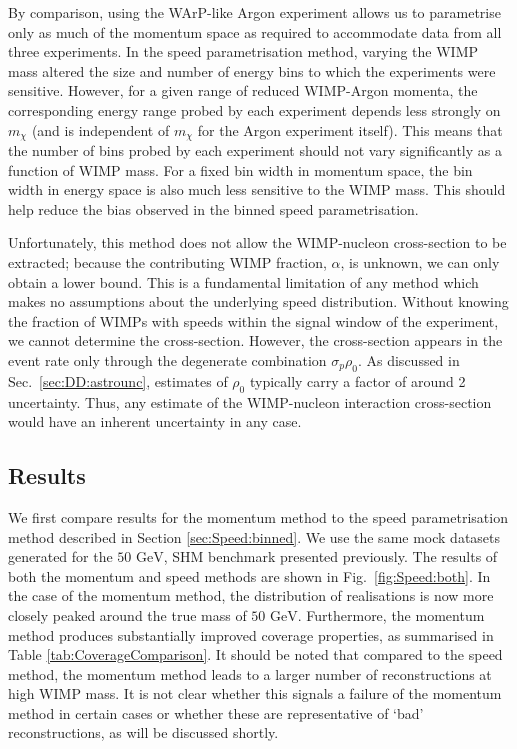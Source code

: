 

By comparison, using the WArP-like Argon experiment allows us to parametrise only as much of the momentum space as required to accommodate data from all three experiments. In the speed parametrisation method, varying the WIMP mass altered the size and number of energy bins to which the experiments were sensitive. However, for a given range of reduced WIMP-Argon momenta, the corresponding energy range probed by each experiment depends less strongly on $m_\chi$ (and is independent of $m_\chi$ for the Argon experiment itself). This means that the number of bins probed by each experiment should not vary significantly as a function of WIMP mass. For a fixed bin width in momentum space, the bin width in energy space is also much less sensitive to the WIMP mass. This should help reduce the bias observed in the binned speed parametrisation.

Unfortunately, this method does not allow the WIMP-nucleon cross-section to be extracted; because the contributing WIMP fraction, \(\alpha\), is unknown, we can only obtain a lower bound. This is a fundamental limitation of any method which makes no assumptions about the underlying speed distribution. Without knowing the fraction of WIMPs with speeds within the signal window of the experiment, we cannot determine the cross-section. However, the cross-section appears in the event rate only through the degenerate combination \(\sigma_p \rho_0\). As discussed in Sec.~\ref{sec:DD:astrounc}, estimates of $\rho_0$ typically carry a factor of around 2 uncertainty. Thus, any estimate of the WIMP-nucleon interaction cross-section would have an inherent uncertainty in any case.

\subsection{Results}

We first compare results for the momentum method to the speed parametrisation method described in Section \ref{sec:Speed:binned}. We use the same mock datasets generated for the \(50 \textrm{ GeV}\), SHM benchmark presented previously. The results of both the momentum and speed methods are shown in Fig.\ \ref{fig:Speed:both}. In the case of the momentum method, the distribution of realisations is now more closely peaked around the true mass of \(50 \textrm{ GeV}\). Furthermore, the momentum method produces substantially improved coverage properties, as summarised in Table \ref{tab:CoverageComparison}. It should be noted that compared to the speed method, the momentum method leads to a larger number of reconstructions at high WIMP mass. It is not clear whether this signals a failure of the momentum method in certain cases or whether these are representative of `bad' reconstructions, as will be discussed shortly.

